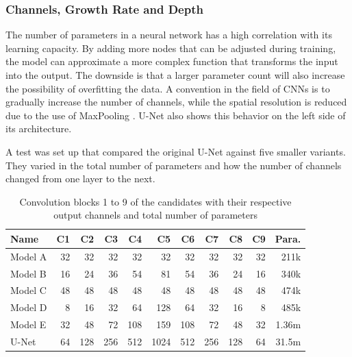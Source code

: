 \subsubsection{Channels, Growth Rate and Depth}

The number of parameters in a neural network has a high correlation with its learning capacity. By adding more nodes that can be adjusted during training, the model can approximate a more complex function that transforms the input into the output. The downside is that a larger parameter count will also increase the possibility of overfitting the data. A convention in the field of CNNs is to gradually increase the number of channels, while the spatial resolution is reduced due to the use of MaxPooling \cite{Krizhevsky}\cite{He2015b}\cite{Iandola2016a}\cite{Ronneberger2015a}. U-Net also shows this behavior on the left side of its architecture.

A test was set up that compared the original U-Net against five smaller variants. They varied in the total number of parameters and how the number of channels changed from one layer to the next.

\begin{table}[H]
    \centering
    \begin{tabular}{| l || r | r | r | r | r | r | r | r | r || r |}
    \hline
    Name    & C1   & C2   & C3   & C4   & C5   & C6   & C7   & C8   & C9  & Para. \\ 
    \hline
    \hline
    Model A &   32 &   32 &   32 &   32 &   32 &   32 &   32 &   32 &  32 & 211k      \\
    \hline
    Model B &   16 &   24 &   36 &   54 &   81 &   54 &   36 &   24 &  16 & 340k      \\
    \hline
    Model C &   48 &   48 &   48 &   48 &   48 &   48 &   48 &   48 &  48 & 474k      \\
    \hline
    Model D &    8 &   16 &   32 &   64 &  128 &   64 &   32 &   16 &   8 & 485k      \\
    \hline
    Model E &   32 &   48 &   72 &  108 &  159 &  108 &   72 &   48 &  32 & 1.36m      \\
    \hline
    U-Net   &   64 &  128 &  256 &  512 & 1024 &  512 &  256 &  128 &  64 & 31.5m      \\
    \hline
    \end{tabular}
    \caption{Convolution blocks 1 to 9 of the candidates with their respective output channels and total number of parameters}
\end{table}

